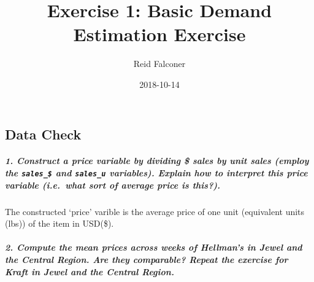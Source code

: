 \documentclass[]{article}
\title{Exercise 1: Basic Demand Estimation Exercise}
\author{Reid Falconer}
\date{2018-10-14}
\newenvironment{Shaded}{\begin{snugshade}}{\end{snugshade}}
\newcommand{\CommentTok}[1]{\textcolor[rgb]{0.56,0.35,0.01}{\textit{#1}}}
\newcommand{\NormalTok}[1]{#1}
\newcommand{\OperatorTok}[1]{\textcolor[rgb]{0.81,0.36,0.00}{\textbf{#1}}}
\newcommand{\StringTok}[1]{\textcolor[rgb]{0.31,0.60,0.02}{#1}}
\let\oldsubparagraph\subparagraph
\renewcommand{\subparagraph}[1]{\oldsubparagraph{#1}\mbox{}}
\begin{document}
\maketitle

\leavevmode\hypertarget{logo-container}{}%

\hypertarget{data-check}{%
\subsection{Data Check}\label{data-check}}

\hypertarget{construct-a-price-variable-by-dividing-sales-by-unit-sales-employ-the-sales_-and-sales_u-variables.-explain-how-to-interpret-this-price-variable-i.e.what-sort-of-average-price-is-this.}{%
\subparagraph{\texorpdfstring{1. Construct a price variable by dividing
\$ sales by unit sales (employ the \texttt{sales\_\$} and
\texttt{sales\_u} variables). Explain how to interpret this price
variable (i.e.~what sort of average price is
this?).}{1. Construct a price variable by dividing \$ sales by unit sales (employ the sales\_\$ and sales\_u variables). Explain how to interpret this price variable (i.e.~what sort of average price is this?).}}\label{construct-a-price-variable-by-dividing-sales-by-unit-sales-employ-the-sales_-and-sales_u-variables.-explain-how-to-interpret-this-price-variable-i.e.what-sort-of-average-price-is-this.}}

\begin{Shaded}
\end{Shaded}

The constructed `price' varible is the average price of one unit
(equivalent units (lbs)) of the item in USD(\$).

\hypertarget{compute-the-mean-prices-across-weeks-of-hellmans-in-jewel-and-the-central-region.-are-they-comparable-repeat-the-exercise-for-kraft-in-jewel-and-the-central-region.}{%
\subparagraph{2. Compute the mean prices across weeks of Hellman's in
Jewel and the Central Region. Are they comparable? Repeat the exercise
for Kraft in Jewel and the Central
Region.}\label{compute-the-mean-prices-across-weeks-of-hellmans-in-jewel-and-the-central-region.-are-they-comparable-repeat-the-exercise-for-kraft-in-jewel-and-the-central-region.}}
\end{document}
